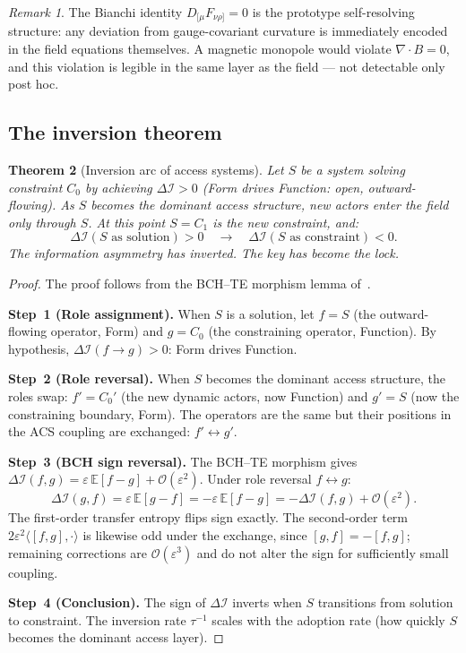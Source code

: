 \documentclass[11pt,a4paper]{article}
\theoremstyle{plain}
\newtheorem{theorem}{Theorem}[section]
\theoremstyle{definition}
\theoremstyle{remark}
\newtheorem{remark}[theorem]{Remark}
\newcommand{\DI}{\Delta\mathcal{I}}
\newcommand{\Order}[1]{\mathcal{O}(#1)}
\newcommand{\eps}{\varepsilon}
\begin{document}
\begin{remark}
The Bianchi identity $D_{[\mu}F_{\nu\rho]} = 0$ is the prototype 
self-resolving structure: any deviation from gauge-covariant curvature 
is immediately encoded in the field equations themselves.  
A magnetic monopole would violate $\nabla \cdot B = 0$, and this 
violation is legible in the same layer as the field --- not 
detectable only post hoc.
\end{remark}

\subsection{The inversion theorem}

\begin{theorem}[Inversion arc of access systems]\label{thm:inversion}
Let $S$ be a system solving constraint $C_0$ by achieving $\DI > 0$ 
(Form drives Function: open, outward-flowing).  As $S$ becomes the 
dominant access structure, new actors enter the field only through $S$.  
At this point $S = C_1$ is the new constraint, and:
\begin{equation}
  \DI(S\text{ as solution}) > 0 \quad\longrightarrow\quad 
  \DI(S\text{ as constraint}) < 0.
\end{equation}
The information asymmetry has inverted.  The key has become the lock.
\end{theorem}

\begin{proof}
The proof follows from the BCH--TE morphism lemma of~\cite{Wallace2026a}.

\textbf{Step~1 (Role assignment).}
When $S$ is a solution, let $f = S$ (the outward-flowing operator, Form)
and $g = C_0$ (the constraining operator, Function).  By hypothesis,
$\DI(f \to g) > 0$: Form drives Function.

\textbf{Step~2 (Role reversal).}
When $S$ becomes the dominant access structure, the roles swap:
$f' = C_0'$ (the new dynamic actors, now Function) and $g' = S$
(now the constraining boundary, Form).  The operators are the same
but their positions in the ACS coupling are exchanged: $f' \leftrightarrow g'$.

\textbf{Step~3 (BCH sign reversal).}
The BCH--TE morphism gives $\DI(f, g) = \eps\,\mathbb{E}[f - g] + \Order{\eps^2}$.
Under role reversal $f \leftrightarrow g$:
\[
  \DI(g, f) = \eps\,\mathbb{E}[g - f] = -\eps\,\mathbb{E}[f - g]
  = -\DI(f, g) + \Order{\eps^2}.
\]
The first-order transfer entropy flips sign exactly.  The second-order
term $2\eps^2\langle [f,g],\cdot\rangle$ is likewise odd under the
exchange, since $[g,f] = -[f,g]$; remaining corrections are
$\Order{\eps^3}$ and do not alter the sign for sufficiently small
coupling.

\textbf{Step~4 (Conclusion).}
The sign of $\DI$ inverts when $S$ transitions from solution to
constraint.  The inversion rate $\tau^{-1}$ scales with the adoption
rate (how quickly $S$ becomes the dominant access layer).
\end{proof}
\end{document}
